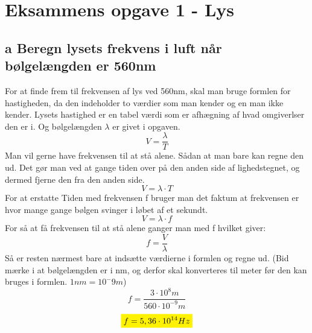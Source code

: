 \section{Eksammens opgave 1 - Lys}\label{sec:eks1}
\subsection{a Beregn lysets frekvens i luft når bølgelængden er 560nm}
For at finde frem til frekvensen af lys ved 560nm, skal man bruge formlen for hastigheden, da den indeholder to værdier som man kender og en man ikke kender. Lysets hastighed er en tabel værdi som er afhægning af hvad omgiverlser den er i. Og bølgelængden \begin{math}\lambda\end{math} er givet i opgaven.
\begin{equation*}
    V=\frac{\lambda}{T}
\end{equation*}
Man vil gerne have frekvensen til at stå alene. Sådan at man bare kan regne den ud. Det gør man ved at gange tiden over på den anden side af lighedstegnet, og dermed fjerne den fra den anden side. 
\begin{equation*}
    V=\lambda\cdot T
\end{equation*}
For at erstatte Tiden med frekvensen f bruger man det faktum at frekvensen er hvor mange gange bølgen svinger i løbet af et sekundt.
\begin{equation*}
    V=\lambda \cdot f 
\end{equation*}
For så at få frekvensen til at stå alene ganger man med f hvilket giver:
\begin{equation*}
    f=\frac{V}{\lambda}
\end{equation*}
Så er resten nærmest bare at indsætte værdierne i formlen og regne ud. (Bid mærke i at bølgelængden er i nm, og derfor skal konverteres til meter før den kan bruges i formlen. \begin{math}1 nm=10^-9m\end{math})
\begin{equation*}
    f=\frac{3 \cdot 10^8 m}{560 \cdot 10^{-9} m}
\end{equation*}
\textbf{\begin{equation*}
    \mathcolorbox{yellow}{f=5,36 \cdot 10^{14} Hz}
\end{equation*}}
